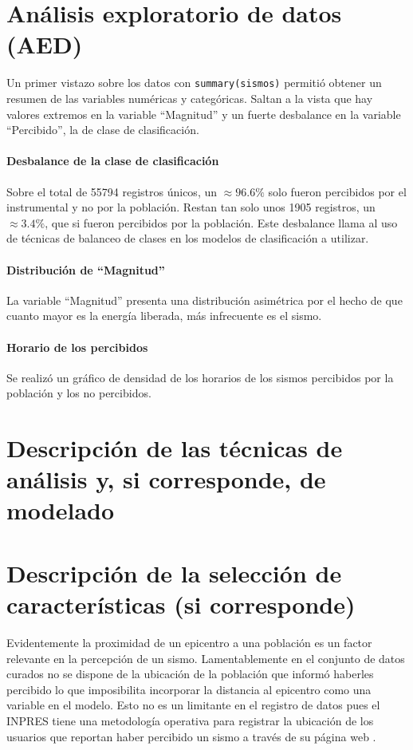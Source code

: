 \documentclass[a4paper]{report}
\begin{document}
\section{Análisis exploratorio de datos (AED)}\label{sec:AED}

Un primer vistazo sobre los datos con \verb'summary(sismos)' permitió obtener un resumen de las variables numéricas y categóricas.
Saltan a la vista que hay valores extremos en la variable ``Magnitud'' y un fuerte desbalance en la variable ``Percibido'', la de clase de clasificación.

\paragraph{Desbalance de la clase de clasificación}
Sobre el total de 55794 registros únicos, un \(\approx 96.6\%\) solo fueron percibidos por el instrumental y no por la población.
Restan tan solo unos 1905 registros, un \(\approx 3.4\%\), que si fueron percibidos por la población.
Este desbalance llama al uso de técnicas de balanceo de clases en los modelos de clasificación a utilizar.

\paragraph{Distribución de ``Magnitud''}
La variable ``Magnitud'' presenta una distribución asimétrica por el hecho de que cuanto mayor es la energía liberada, más infrecuente es el sismo.


\paragraph{Horario de los percibidos}
Se realizó un gráfico de densidad de los horarios de los sismos percibidos por la población y los no percibidos.


\section{Descripción de las técnicas de análisis y, si corresponde, de modelado}

\section{Descripción de la selección de características (si corresponde)}

Evidentemente la proximidad de un epicentro a una población es un factor relevante en la percepción de un sismo.
Lamentablemente en el conjunto de datos curados no se dispone de la ubicación de la población que informó haberles percibido lo que imposibilita incorporar la distancia al epicentro como una variable en el modelo.
Esto no es un limitante en el registro de datos pues el INPRES tiene una metodología operativa para registrar la ubicación de los usuarios que reportan haber percibido un sismo a través de su página web \cite{noauthor_acerca_nodate}. 
\end{document}
